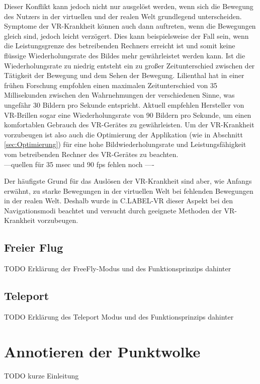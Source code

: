 Dieser Konflikt kann jedoch nicht nur ausgelöst werden, wenn sich die Bewegung des Nutzers in der virtuellen und der realen Welt grundlegend unterscheiden. Symptome der VR-Krankheit können auch dann auftreten, wenn die Bewegungen gleich sind, jedoch leicht verzögert. Dies kann beispielsweise der Fall sein, wenn die Leistungsgrenze des betreibenden Rechners erreicht ist und somit keine flüssige Wiederholungsrate des Bildes mehr gewährleistet werden kann. Ist die Wiederholungsrate zu niedrig entsteht ein zu großer Zeitunterschied zwischen der Tätigkeit der Bewegung und dem Sehen der Bewegung. Lilienthal hat in einer frühen Forschung empfohlen einen maximalen Zeitunterschied von 35 Millisekunden zwischen den Wahrnehmungen der verschiedenen Sinne, was ungefähr 30 Bildern pro Sekunde entspricht. Aktuell empfehlen Hersteller von VR-Brillen sogar eine Wiederholungsrate von 90 Bildern pro Sekunde, um einen komfortablen Gebrauch des VR-Gerätes zu gewährleisten. Um der VR-Krankheit vorzubeugen ist also auch die Optimierung der Applikation (wie in Abschnitt \ref{sec:Optimierung}) für eine hohe Bildwiederholungsrate und Leistungsfähigkeit vom betreibenden Rechner des VR-Gerätes zu beachten.\\
---quellen für 35 msec und 90 fps fehlen noch ----

Der häufigste Grund für das Auslösen der VR-Krankheit sind aber, wie Anfangs erwähnt, zu starke Bewegungen in der virtuellen Welt bei fehlenden Bewegungen in der realen Welt. Deshalb wurde in C.LABEL-VR dieser Aspekt bei den Navigationsmodi beachtet und versucht durch geeignete Methoden der VR-Krankheit vorzubeugen. 


\subsection{Freier Flug}
\label{sec:FreeFlyMode}
TODO Erklärung der FreeFly-Modus und des Funktionsprinzips dahinter

\subsection{Teleport}
\label{sec:TeleportMode}
TODO Erklärung des Teleport Modus und des Funktionsprinzips dahinter

\section{Annotieren der Punktwolke}
\label{sec:Annotation}
TODO kurze Einleitung

